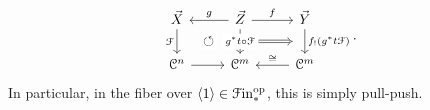 \documentclass[main.tex]{subfiles}
\begin{document}
\begin{equation*}
  \begin{tikzcd}
    \vec{X}
    \arrow[d, "\mathcal{F}"{left}, ""{name=L, right}]
    & \vec{Z}
    \arrow[d, "g^{*}t \circ \mathcal{F}"{description}, ""{name=ML, left}, ""{name=MR, right}]
    \arrow[r, "f"]
    \arrow[l, swap, "g"]
    & \vec{Y}
    \arrow[d, ""{name=R, right}, "f_{!}(g^{*}t\mathcal{F})"]
    \\
    \category{C}^{n}
    \arrow[r]
    & \category{C}^{m}
    & \category{C}^{m}
    \arrow[l, swap, "\cong"]
    \arrow[from=ML, to=L, phantom, shorten=1.5ex, "\circlearrowleft"{description}]
    \arrow[from=MR, to=R, Rightarrow, shorten=2ex]
  \end{tikzcd}.
\end{equation*}
In particular, in the fiber over $\langle 1 \rangle \in \mathcal{F}\mathrm{in}_{*}^{\mathrm{op}}$, this is simply pull-push.

\end{document}
